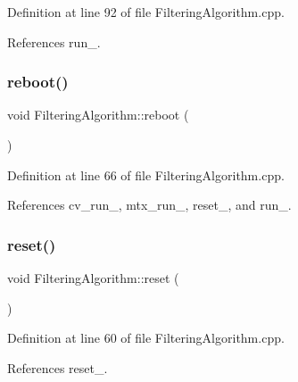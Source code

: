 Definition at line 92 of file Filtering\+Algorithm.\+cpp.



References run\+\_\+.

\mbox{\label{classbfl_1_1FilteringAlgorithm_a6022859aa985474fb997343cc935b11e}} 
\subsubsection{\texorpdfstring{reboot()}{reboot()}}
{\footnotesize\ttfamily void Filtering\+Algorithm\+::reboot (\begin{DoxyParamCaption}{ }\end{DoxyParamCaption})}



Definition at line 66 of file Filtering\+Algorithm.\+cpp.



References cv\+\_\+run\+\_\+, mtx\+\_\+run\+\_\+, reset\+\_\+, and run\+\_\+.

\mbox{\label{classbfl_1_1FilteringAlgorithm_a2403c62fbd7bd7f5cda56a84f5f30331}} 
\subsubsection{\texorpdfstring{reset()}{reset()}}
{\footnotesize\ttfamily void Filtering\+Algorithm\+::reset (\begin{DoxyParamCaption}{ }\end{DoxyParamCaption})}



Definition at line 60 of file Filtering\+Algorithm.\+cpp.



References reset\+\_\+.

\mbox{\label{classbfl_1_1FilteringAlgorithm_a009cbe5f4bbb16967f6c6ddcaed8fbb1}} 
